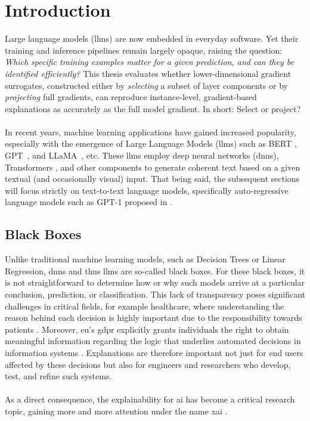 \chapter{Introduction}\label{cha:introduction}
Large language models (\acrshort{llm}s) are now embedded in everyday software. Yet their training and inference pipelines remain largely opaque, raising the question: \emph{Which specific training examples matter for a given prediction, and can they be identified efficiently?} This thesis evaluates whether lower-dimensional gradient surrogates, constructed either by \emph{selecting} a subset of layer components or by \emph{projecting} full gradients, can reproduce instance-level, gradient-based explanations as accurately as the full model gradient. In short: Select or project?
\\\\
In recent years, machine learning applications have gained increased popularity, especially with the emergence of Large Language Models (\acrshort{llm}s) such as BERT \cite{DBLP:conf/naacl/DevlinCLT19}, GPT~\cite{DBLP:conf/nips/BrownMRSKDNSSAA20, openai_2023}, and LLaMA~\cite{DBLP:journals/corr/abs-2307-09288, DBLP:journals/corr/abs-2407-21783}, etc. These \acrshort{llm}s employ deep neural networks (\acrshort{dnn}s), Transformers \cite{DBLP:conf/nips/VaswaniSPUJGKP17}, and other components to generate coherent text based on a given textual (and occasionally visual) input. That being said, the subsequent sections will focus strictly on text-to-text language models, specifically auto-regressive language models such as GPT-1 proposed in \cite{openai_2018_generative_pre_training}.

\section{Black Boxes} \label{sec:black_boxes}
Unlike traditional machine learning models, such as Decision Trees or Linear Regression, \acrshort{dnn}s and thus \acrshort{llm}s are so-called black boxes. For these black boxes, it is not straightforward to determine how or why such models arrive at a particular conclusion, prediction, or classification. This lack of transparency poses significant challenges in critical fields, for example healthcare, where understanding the reason behind each decision is highly important due to the responsibility towards patients \cite{DBLP:journals/corr/abs-2401-04374}. Moreover, \acrshort{eu}'s \acrfull{gdpr} explicitly grants individuals the right to obtain meaningful information regarding the logic that underlies automated decisions in information systems \cite{european_commission_regulation_2016}. Explanations are therefore important not just for end users affected by these decisions but also for engineers and researchers who develop, test, and refine such systems.
\\\\
As a direct consequence, the explainability for \acrfull{ai} has become a critical research topic, gaining more and more attention under the name \acrfull{xai} \cite{DBLP:journals/widm/ConfalonieriCWB21}.

